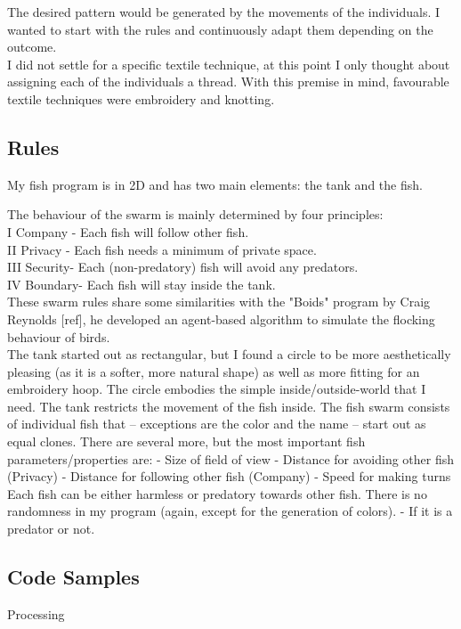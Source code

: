 \documentclass{scrartcl}
\begin{document}
The desired pattern would be generated by the movements of the individuals. I wanted to start with the rules and continuously adapt them depending on the outcome.\\
I did not settle for a specific textile technique, at this point I only thought about assigning each of the individuals a thread. With this premise in mind, favourable textile techniques were embroidery and knotting.


\subsection{Rules}
My fish program is in 2D and has two main elements: the tank and the fish.

The behaviour of the swarm is mainly determined by four principles:\\
I Company - Each fish will follow other fish.\\
II Privacy - Each fish needs a minimum of private space.\\
III Security- Each (non-predatory) fish will avoid any predators.\\
IV Boundary- Each fish will stay inside the tank.\\

These swarm rules share some similarities with the "Boids" program by Craig Reynolds [ref], he developed an agent-based algorithm to simulate the flocking behaviour of birds.\\


The tank started out as rectangular, but I found a circle to be more aesthetically pleasing (as it is a softer, more natural shape) as well as more fitting for an embroidery hoop. The circle embodies the simple inside/outside-world that I need. The tank restricts the movement of the fish inside.
The fish swarm consists of individual fish that – exceptions are the color and the name – start out as equal clones. There are several more, but the most important fish parameters/properties are:
-	Size of field of view
-	Distance for avoiding other fish (Privacy)
-	Distance for following other fish (Company)
-	Speed for making turns
Each fish can be either harmless or predatory towards other fish.
There is no randomness in my program (again, except for the generation of colors).
-	If it is a predator or not.

\subsection{Code Samples}
Processing
\end{document}
